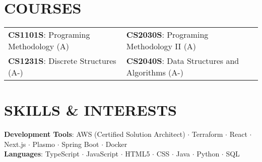 \documentclass[letterpaper,11pt]{article}
\begin{document}
\section{COURSES}
\begin{tabularx}{\textwidth}{X X}
  \textbf{CS1101S}: Programing Methodology (A) & \textbf{CS2030S}: Programing Methodology II (A) \\
  \textbf{CS1231S}: Discrete Structures (A-) & \textbf{CS2040S}: Data Structures and Algorithms (A-) \\
\end{tabularx}

\section{SKILLS \& INTERESTS}
 \begin{itemize}[leftmargin=0.15in, label={}]
    \small{\item{
    \vspace{1mm}
    \textbf{Development Tools}{: AWS (Certified Solution Architect) {\bfseries\large$\cdot$} Terraform {\bfseries\large$\cdot$} React {\bfseries\large$\cdot$} Next.js {\bfseries\large$\cdot$} Plasmo  {\bfseries\large$\cdot$} Spring Boot {\bfseries\large$\cdot$} Docker } \\
    \vspace{1mm}
    \textbf{Languages}{: TypeScript {\bfseries\large$\cdot$} JavaScript {\bfseries\large$\cdot$} HTML5 {\bfseries\large$\cdot$} CSS {\bfseries\large$\cdot$} Java {\bfseries\large$\cdot$} Python {\bfseries\large$\cdot$} SQL} \\
    \vspace{1mm}

    }}
 \end{itemize}
 \begin{center}
\end{center}
\end{document}
